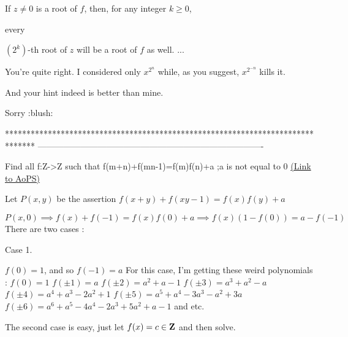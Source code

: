 \begin{solution}
	\begin{tcolorbox}If $z \neq 0$ is a root of $f$, then, for any integer $k \geq 0$, \begin{bolded}every\end{bolded} $\left(2^k\right)$-th root of $z$ will be a root of $f$ as well.  ...\end{tcolorbox}
You're quite right. I considered only $x^{2^n}$ while, as you suggest, $x^{2^{-n}}$ kills it.

And your hint indeed is better than mine.

Sorry :blush:
\end{solution}
*******************************************************************************
-------------------------------------------------------------------------------

\begin{problem}
	Find all f:Z->Z such that
f(m+n)+f(mn-1)=f(m)f(n)+a ;a is not equal to 0
	\flushright \href{https://artofproblemsolving.com/community/q1h573996}{(Link to AoPS)}
\end{problem}



\begin{solution}
	Let $P(x,y)$ be the assertion $f(x+y)+f(xy-1)=f(x)f(y)+a$

$P(x,0)\implies f(x)+f(-1)=f(x)f(0)+a\implies f(x)(1-f(0))=a-f(-1)$
There are two cases :

\begin{bolded}Case 1.\end{bolded} $f(0)=1$, and so $f(-1)=a$
For this case, I'm getting these weird polynomials :
$f(0)=1$
$f(\pm 1)=a$
$f(\pm 2)=a^2+a-1$
$f(\pm 3)=a^3+a^2-a$
$f(\pm 4)=a^4+a^3-2a^2+1$
$f(\pm 5)=a^5+a^4-3a^3-a^2+3a$
$f(\pm 6)=a^6+a^5-4a^4-2a^3+5a^2+a-1$
and etc.

The second case is easy, just let $f(x)=c\in \bf Z$ and then solve.
\end{solution}



